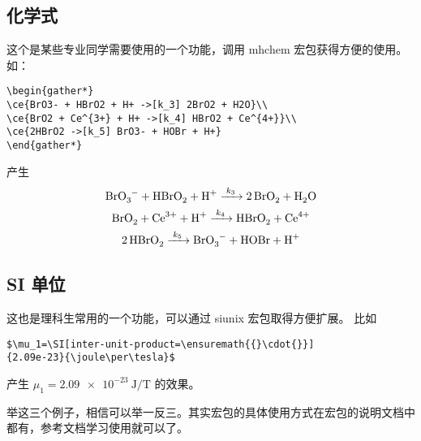 \subsection{化学式}
这个是某些专业同学需要使用的一个功能，调用 mhchem 宏包获得方便的使用。如：
\begin{Verbatim}[frame=single]
\begin{gather*}
\ce{BrO3- + HBrO2 + H+ ->[k_3] 2BrO2 + H2O}\\
\ce{BrO2 + Ce^{3+} + H+ ->[k_4] HBrO2 + Ce^{4+}}\\
\ce{2HBrO2 ->[k_5] BrO3- + HOBr + H+}
\end{gather*}
\end{Verbatim}
产生
\begin{gather*}
\ce{BrO3- + HBrO2 + H+ ->[k_3] 2BrO2 + H2O}\\
\ce{BrO2 + Ce^{3+} + H+ ->[k_4] HBrO2 + Ce^{4+}}\\
\ce{2HBrO2 ->[k_5] BrO3- + HOBr + H+}
\end{gather*}

\subsection{SI 单位}
这也是理科生常用的一个功能，可以通过 siunix 宏包取得方便扩展。
比如 
\begin{Verbatim}[frame=single]
$\mu_1=\SI[inter-unit-product=\ensuremath{{}\cdot{}}]
{2.09e-23}{\joule\per\tesla}$
\end{Verbatim}
产生 $\mu_1=\SI[inter-unit-product=\ensuremath{{}\cdot{}}]{2.09e-23}{\joule\per\tesla}$ 的效果。

举这三个例子，相信可以举一反三。其实宏包的具体使用方式在宏包的说明文档中都有，参考文档学习使用就可以了。
